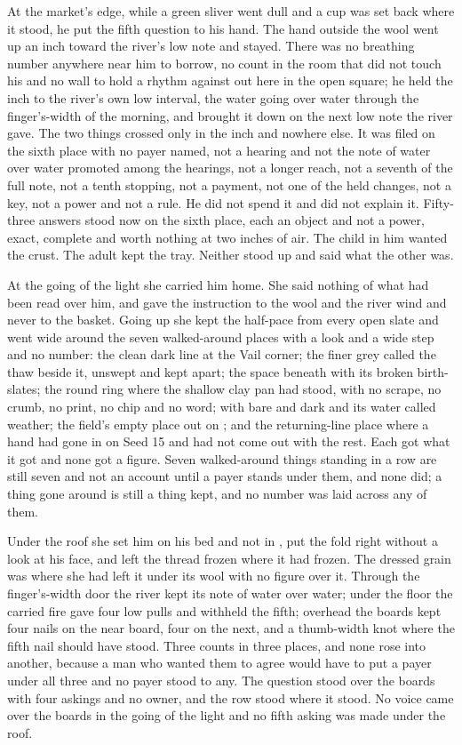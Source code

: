 At the market's edge, while a green sliver went dull and a cup was set back where it stood, he put the fifth question to his hand. The hand outside the wool went up an inch toward the river's low note and stayed. There was no breathing number anywhere near him to borrow, no count in the room that did not touch his and no wall to hold a rhythm against out here in the open square; he held the inch to the river's own low interval, the water going over water through the finger's-width of the morning, and brought it down on the next low note the river gave. The two things crossed only in the inch and nowhere else. It was filed on the sixth place with no payer named, not a hearing and not the note of water over water promoted among the hearings, not a longer reach, not a seventh of the full note, not a tenth stopping, not a payment, not one of the held changes, not a key, not a power and not a rule. He did not spend it and did not explain it. Fifty-three answers stood now on the sixth place, each an object and not a power, exact, complete and worth nothing at two inches of air. The child in him wanted the crust. The adult kept the tray. Neither stood up and said what the other was.

At the going of the light she carried him home. She said nothing of what had been read over him, and gave the instruction to the wool and the river wind and never to the basket. Going up  she kept the half-pace from every open slate and went wide around the seven walked-around places with a look and a wide step and no number: the clean dark line at the Vail corner; the finer grey called the thaw beside it, unswept and kept apart; the space beneath  with its broken birth-slates; the round ring where the shallow clay pan had stood, with no scrape, no crumb, no print, no chip and no word;  with  bare and dark and its water called weather; the field's empty place out on ; and the returning-line place where a hand had gone in on Seed 15 and had not come out with the rest. Each got what it got and none got a figure. Seven walked-around things standing in a row are still seven and not an account until a payer stands under them, and none did; a thing gone around is still a thing kept, and no number was laid across any of them.

Under the roof she set him on his bed and not in , put the fold right without a look at his face, and left the thread frozen where it had frozen. The dressed grain was where she had left it under its wool with no figure over it. Through the finger's-width door the river kept its note of water over water; under the floor the carried fire gave four low pulls and withheld the fifth; overhead the boards kept four nails on the near board, four on the next, and a thumb-width knot where the fifth nail should have stood. Three counts in three places, and none rose into another, because a man who wanted them to agree would have to put a payer under all three and no payer stood to any. The question stood over the boards with four askings and no owner, and the row stood where it stood. No voice came over the boards in the going of the light and no fifth asking was made under the roof.

